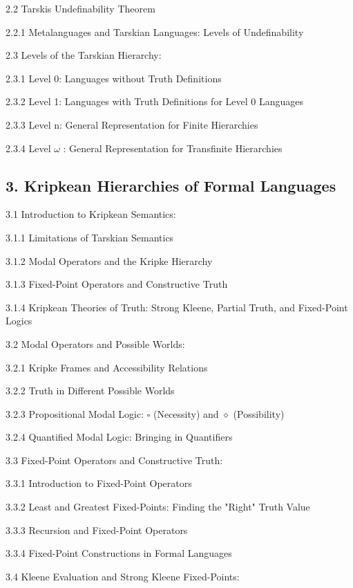 2.2 Tarski\textquotesingle s Undefinability Theorem

2.2.1 Metalanguages and Tarskian Languages: Levels of Undefinability

2.3 Levels of the Tarskian Hierarchy:

2.3.1 Level 0: Languages without Truth Definitions

2.3.2 Level 1: Languages with Truth Definitions for Level 0 Languages

2.3.3 Level n: General Representation for Finite Hierarchies

2.3.4 Level $\omega$ : General Representation for Transfinite Hierarchies

\hypertarget{kripkean-hierarchies-of-formal-languages}{%
\subsection*{3. Kripkean Hierarchies of Formal
Languages}\label{kripkean-hierarchies-of-formal-languages}}

3.1 Introduction to Kripkean Semantics:

3.1.1 Limitations of Tarskian Semantics

3.1.2 Modal Operators and the Kripke Hierarchy

3.1.3 Fixed-Point Operators and Constructive Truth

3.1.4 Kripkean Theories of Truth: Strong Kleene, Partial Truth, and
Fixed-Point Logics

3.2 Modal Operators and Possible Worlds:

3.2.1 Kripke Frames and Accessibility Relations

3.2.2 Truth in Different Possible Worlds

3.2.3 Propositional Modal Logic: $\square$  (Necessity) and $\diamond$  (Possibility)

3.2.4 Quantified Modal Logic: Bringing in Quantifiers

3.3 Fixed-Point Operators and Constructive Truth:

3.3.1 Introduction to Fixed-Point Operators

3.3.2 Least and Greatest Fixed-Points: Finding the "Right" Truth Value

3.3.3 Recursion and Fixed-Point Operators

3.3.4 Fixed-Point Constructions in Formal Languages

3.4 Kleene Evaluation and Strong Kleene Fixed-Points:

